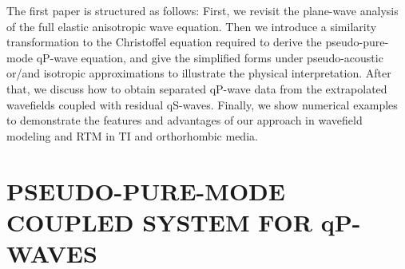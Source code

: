 The first paper is structured as follows: First, we revisit the plane-wave analysis of the full elastic anisotropic
 wave equation. Then we introduce a similarity transformation to the Christoffel equation required to
 derive the pseudo-pure-mode qP-wave equation, and give the simplified forms under pseudo-acoustic or/and isotropic
 approximations to illustrate the physical interpretation.
 After that, we discuss how to obtain separated qP-wave
 data from the extrapolated wavefields coupled with residual qS-waves.
Finally, we show numerical examples
to demonstrate the features and advantages of our approach in wavefield modeling and RTM in 
TI and orthorhombic media.

\section{PSEUDO-PURE-MODE COUPLED SYSTEM FOR qP-WAVES}

